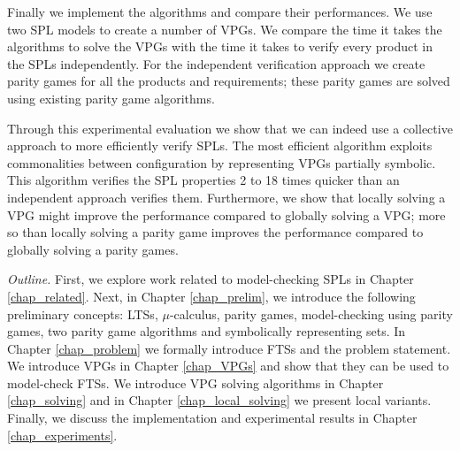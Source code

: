 Finally we implement the algorithms and compare their performances. We use two SPL models to create a number of VPGs. We compare the time it takes the algorithms to solve the VPGs with the time it takes to verify every product in the SPLs independently. For the independent verification approach we create parity games for all the products and requirements; these parity games are solved using existing parity game algorithms.

Through this experimental evaluation we show that we can indeed use a collective approach to more efficiently verify SPLs. The most efficient algorithm exploits commonalities between configuration by representing VPGs partially symbolic. This algorithm verifies the SPL properties 2 to 18 times quicker than an independent approach verifies them. Furthermore, we show that locally solving a VPG might improve the performance compared to globally solving a VPG; more so than locally solving a parity game improves the performance compared to globally solving a parity games.

\textit{Outline.} First, we explore work related to model-checking SPLs in Chapter \ref{chap_related}. Next, in Chapter \ref{chap_prelim}, we introduce the following preliminary concepts: LTSs, $\mu$-calculus, parity games, model-checking using parity games, two parity game algorithms and symbolically representing sets. In Chapter \ref{chap_problem} we formally introduce FTSs and the problem statement. We introduce VPGs in Chapter \ref{chap_VPGs} and show that they can be used to model-check FTSs. We introduce VPG solving algorithms in Chapter \ref{chap_solving} and in Chapter \ref{chap_local_solving} we present local variants. Finally, we discuss the implementation and experimental results in Chapter \ref{chap_experiments}.